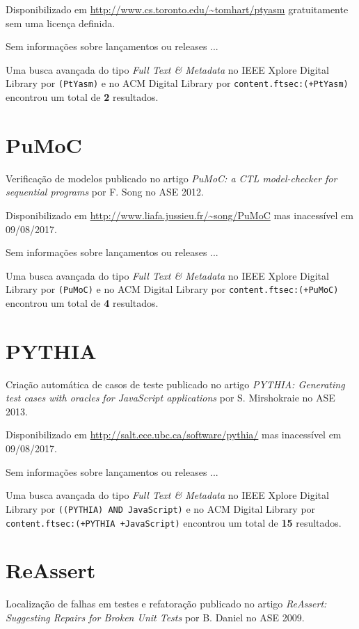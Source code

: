 Disponibilizado em \url{http://www.cs.toronto.edu/~tomhart/ptyasm}
gratuitamente
sem uma licença definida.

Sem informações sobre lançamentos ou releases ...


Uma busca avançada do tipo {\it Full Text \& Metadata} no IEEE Xplore Digital Library por
\texttt{(PtYasm)}
e no ACM Digital Library por
\texttt{content.ftsec:(+PtYasm)}
encontrou um total de
{\bf 2}
resultados.

\section{PuMoC}

Verificação de modelos
publicado no artigo {\it PuMoC: a CTL model-checker for sequential programs}
por F. Song
no ASE 2012.

Disponibilizado em \url{http://www.liafa.jussieu.fr/~song/PuMoC}
mas inacessível em 09/08/2017.

Sem informações sobre lançamentos ou releases ...


Uma busca avançada do tipo {\it Full Text \& Metadata} no IEEE Xplore Digital Library por
\texttt{(PuMoC)}
e no ACM Digital Library por
\texttt{content.ftsec:(+PuMoC)}
encontrou um total de
{\bf 4}
resultados.

\section{PYTHIA}

Criação automática de casos de teste
publicado no artigo {\it PYTHIA: Generating test cases with oracles for JavaScript applications}
por S. Mirshokraie
no ASE 2013.

Disponibilizado em \url{http://salt.ece.ubc.ca/software/pythia/}
mas inacessível em 09/08/2017.

Sem informações sobre lançamentos ou releases ...


Uma busca avançada do tipo {\it Full Text \& Metadata} no IEEE Xplore Digital Library por
\texttt{((PYTHIA) AND JavaScript)}
e no ACM Digital Library por
\texttt{content.ftsec:(+PYTHIA +JavaScript)}
encontrou um total de
{\bf 15}
resultados.

\section{ReAssert}

Localização de falhas em testes e refatoração
publicado no artigo {\it ReAssert: Suggesting Repairs for Broken Unit Tests}
por B. Daniel
no ASE 2009.

